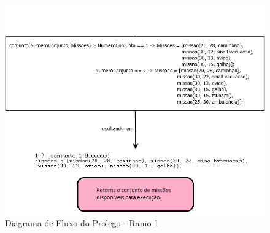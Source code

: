 \FloatBarrier
\begin{figure}[!h]
\centering
\includegraphics[keepaspectratio=true,scale=0.7]{figuras/DiagramaRamo1.png}
\caption{Diagrama de Fluxo do Prolego - Ramo 1}
\label{DiagramaRamo1}
\end{figure}


